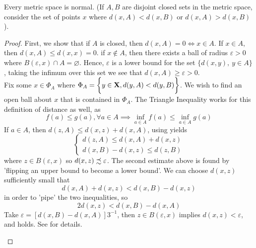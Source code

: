 \documentclass[../../main.tex]{subfiles}
\begin{document}
\begin{wts}
    Every metric space is normal. (If $A,B$ are disjoint closed sets in the metric space, consider the set of points $x$ where $d(x,A)< d(x,B)$ or $d(x,A)> d(x,B)$).
\end{wts}
\begin{proof}
    First, we show that if $A$ is closed, then $d(x,A) = 0\iff x\in A$. If $x\in A$, then $d(x,A)\leq d(x,x) = 0$. if $x\notin A$, then there exists a ball of radius $\varepsilon>0$ where $B(\varepsilon, x)\cap A = \varnothing$. Hence, $\varepsilon$ is a lower bound for the set $\{d(x,y),\: y\in A\}$, taking the infimum over this set we see that $d(x,A)\geq \varepsilon>0$.\\

    Fix some $x\in \Phi_A$ where $\Phi_A = \biggl\{{y\in{\mathbf{X}}, d(y,A) < d(y,B)}\biggr\}$. We wish to find an open ball about $x$ that is contained in $\Phi_A$. The Triangle Inequality works for this definition of distance as well, as
    \begin{equation}\label{eq:function-infimum}
        f(a)\leq g(a), \forall a\in A\implies \inf_{a\in A}f(a)\leq \inf_{a\in A}g(a)
    \end{equation}
    If $a\in A$, then $d(z,A)\leq d(x,z) + d(x,A)$, using  yields 
    \[
        \begin{cases}
            d(z,A)\leq d(x,A) + d(x,z)\\
            d(x,B)-d(x,z)\leq d(z,B)
        \end{cases}
    \]
    where $z\in B(\varepsilon, x)$ so $d(x,z)\precsim\varepsilon$. The second estimate above is found by 'flipping an upper bound to become a lower bound'. We can choose $d(x,z)$ sufficiently small that 
    \[
        d(x,A) + d(x,z) < d(x,B) - d(x,z)
    \]
    in order to 'pipe' the two inequalities, so
    \begin{equation}\label{ex:4.3-distance-estimate}
        2d(x,z) < d(x,B) - d(x,A)
    \end{equation}
    Take $\varepsilon = [d(x,B) - d(x,A)]3^{-1}$, then $z\in B(\varepsilon, x)$ implies $d(x,z)<\varepsilon$, and  holds. See  for details.\\
\begin{figure}
    \centering
\end{figure}
\end{proof}
\end{document}
